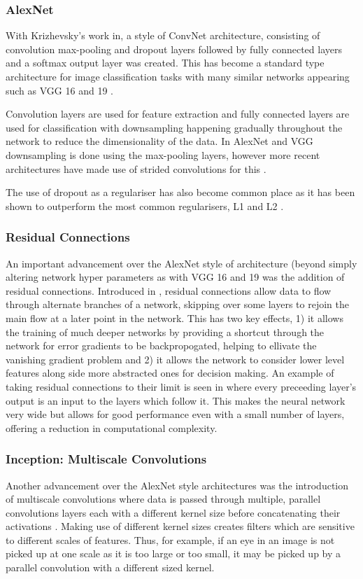 \subsubsection{AlexNet}
With Krizhevsky's work in\cite{krizhevsky2012imagenet}, a style of \ac{ConvNet} architecture, consisting of convolution max-pooling and dropout layers followed by fully connected layers and a softmax output layer was created. This has become a standard type architecture for image classification tasks with many similar networks appearing such as VGG 16 and 19 \cite{simonyan2014very}.

Convolution layers are used for feature extraction and fully connected layers are used for classification with downsampling happening gradually throughout the network to reduce the dimensionality of the data. In AlexNet and VGG downsampling is done using the max-pooling layers, however more recent architectures have made use of strided convolutions for this \cite{springenberg2014striving}.

The use of dropout as a regulariser has also become common place as it has been shown to outperform the most common regularisers, L1 and L2 \cite{srivastava2014dropout}.

\subsubsection{Residual Connections}
An important advancement over the AlexNet style of architecture (beyond simply altering network hyper parameters as with VGG 16 and 19 \cite{simonyan2014very} was the addition of residual connections. Introduced in \cite{he2016deep}, residual connections allow data to flow through alternate branches of a network, skipping over some layers to rejoin the main flow at a later point in the network. This has two key effects, 1) it allows the training of much deeper networks by providing a shortcut through the network for error gradients to be backpropogated, helping to ellivate the vanishing gradient problem \cite{hochreiter1998vanishing} and 2) it allows the network to consider lower level features along side more abstracted ones for decision making.
An example of taking residual connections to their limit is seen in \cite{huang2017densely} where every preceeding layer's output is an input to the layers which follow it. This makes the neural network very wide but allows for good performance even with a small number of layers, offering a reduction in computational complexity.

\subsubsection{Inception: Multiscale Convolutions}
Another advancement over the AlexNet style architectures was the introduction of multiscale convolutions where data is passed through multiple, parallel convolutions layers each with a different kernel size before concatenating their activations \cite{szegedy2015going}. Making use of different kernel sizes creates filters which are sensitive to different scales of features. Thus, for example, if an eye in an image is not picked up at one scale as it is too large or too small, it may be picked up by a parallel convolution with a different sized kernel.

